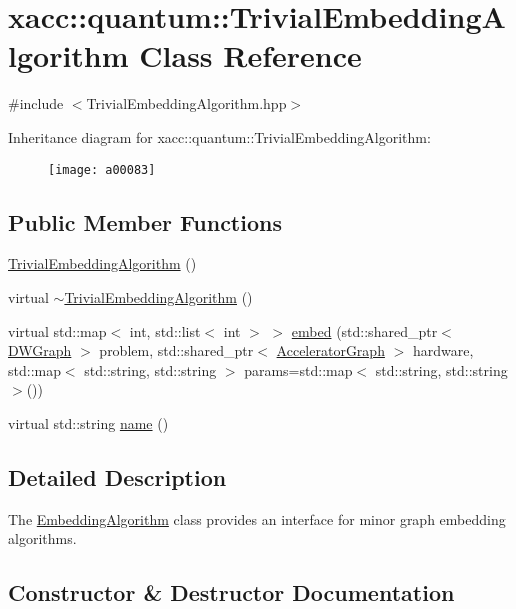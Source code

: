 \hypertarget{a00083}{}\section{xacc\+:\+:quantum\+:\+:Trivial\+Embedding\+Algorithm Class Reference}
\label{a00083}


{\ttfamily \#include $<$Trivial\+Embedding\+Algorithm.\+hpp$>$}

Inheritance diagram for xacc\+:\+:quantum\+:\+:Trivial\+Embedding\+Algorithm\+:\begin{figure}[H]
\begin{center}
\leavevmode
\texttt{[image: a00083]}
\end{center}
\end{figure}
\subsection*{Public Member Functions}
\begin{DoxyCompactItemize}
\item 
\hyperlink{a00083_aa704a3dc5825db1b023c54d84ec0f883}{Trivial\+Embedding\+Algorithm} ()
\item 
virtual \hyperlink{a00083_a692614cae332c77ae46e059b66d6f79c}{$\sim$\+Trivial\+Embedding\+Algorithm} ()
\item 
virtual std\+::map$<$ int, std\+::list$<$ int $>$ $>$ \hyperlink{a00083_a09e162a745528ffa3ea847dd5afee45b}{embed} (std\+::shared\+\_\+ptr$<$ \hyperlink{a00030}{D\+W\+Graph} $>$ problem, std\+::shared\+\_\+ptr$<$ \hyperlink{a00043}{Accelerator\+Graph} $>$ hardware, std\+::map$<$ std\+::string, std\+::string $>$ params=std\+::map$<$ std\+::string, std\+::string $>$())
\item 
virtual std\+::string \hyperlink{a00083_a5d3e8c56b53cda9c682dedc534bf38fb}{name} ()
\end{DoxyCompactItemize}


\subsection{Detailed Description}
The \hyperlink{a00037}{Embedding\+Algorithm} class provides an interface for minor graph embedding algorithms. 

\subsection{Constructor \& Destructor Documentation}

